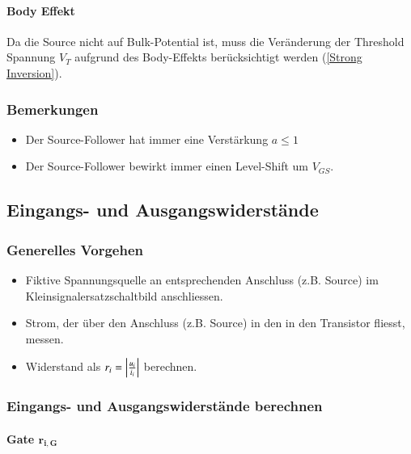 \paragraph{Body Effekt}
Da die Source nicht auf Bulk-Potential ist, muss die Veränderung der Threshold Spannung $V_T$ aufgrund des Body-Effekts berücksichtigt werden (\ref{Strong Inversion}).


\subsubsection{Bemerkungen}
\begin{itemize}
    \item Der Source-Follower hat immer eine Verstärkung $a \leq 1$
    \item Der Source-Follower bewirkt immer einen Level-Shift um $V_{GS}$.
\end{itemize}



\subsection{Eingangs- und Ausgangswiderstände}

\subsubsection{Generelles Vorgehen}

\begin{itemize}
    \item Fiktive Spannungsquelle an entsprechenden Anschluss (z.B. Source) im Kleinsignalersatzschaltbild anschliessen.
    \item Strom, der über den Anschluss (z.B. Source) in den in den Transistor fliesst, messen.
    \item Widerstand als $r_i = \left| \frac{u_i}{i_i} \right|$ berechnen.
\end{itemize}


\subsubsection{Eingangs- und Ausgangswiderstände berechnen}

\paragraph{Gate $\bm{r_{i,G}}$}

\vspace{-0.2cm}

